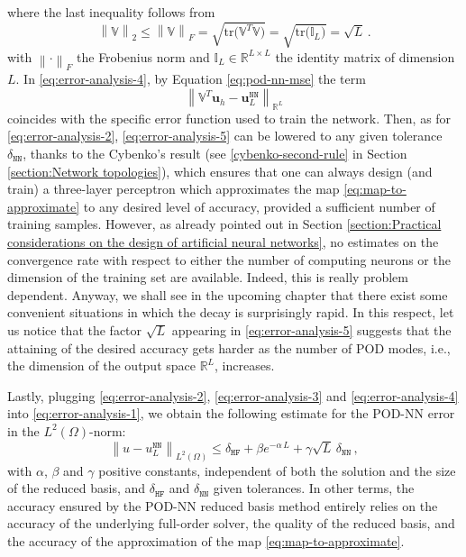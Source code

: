 \documentclass[12pt, a4paper, twoside, openright]{report}
\numberwithin{equation}{chapter}
\theoremstyle{theorem}
\theoremstyle{definition}
\theoremstyle{remark}
\theoremstyle{proposition}
\numberwithin{figure}{chapter}
\newcommand{\norm}[1]{\left\lVert#1\right\rVert}
\begin{document}
		where the last inequality follows from
		\begin{equation*}
			\norm{\mathbb{V}}_2 \leq \norm{\mathbb{V}}_F = \sqrt{\text{tr} \big( \mathbb{V}^T \mathbb{V} \big)} = \sqrt{\text{tr} \big( \mathbb{I}_L \big)} = \sqrt{L} \, .
		\end{equation*}
		with $\norm{\cdot}_F$ the Frobenius norm and $\mathbb{I}_L \in \mathbb{R}^{L \times L}$ the identity matrix of dimension $L$. In \eqref{eq:error-analysis-4}, by Equation \eqref{eq:pod-nn-mse} the term
		\begin{equation}
			\label{eq:error-analysis-5}
			\norm{\mathbb{V}^T \mathbf{u}_h - \mathbf{u}_L^{\texttt{NN}}}_{\mathbb{R}^L}
		\end{equation}
		coincides with the specific error function used to train the network. Then, as for \eqref{eq:error-analysis-2}, \eqref{eq:error-analysis-5} can be lowered to any given tolerance $\delta_{\texttt{NN}}$, thanks to the Cybenko's result (see \ref{cybenko-second-rule} in Section \ref{section:Network topologies}), which ensures that one can always design (and train) a three-layer perceptron which approximates the map \eqref{eq:map-to-approximate} to any desired level of accuracy, provided a sufficient number of training samples. However, as already pointed out in Section \ref{section:Practical considerations on the design of artificial neural networks}, no estimates on the convergence rate with respect to either the number of computing neurons or the dimension of the training set are available. Indeed, this is really problem dependent. Anyway, we shall see in the upcoming chapter that there exist some convenient situations in which the decay is surprisingly rapid. In this respect, let us notice that the factor $\sqrt{L}$ appearing in \eqref{eq:error-analysis-5} suggests that the attaining of the desired accuracy gets harder as the number of POD modes, i.e., the dimension of the output space $\mathbb{R}^L$, increases.
		
		Lastly, plugging \eqref{eq:error-analysis-2}, \eqref{eq:error-analysis-3} and \eqref{eq:error-analysis-4} into \eqref{eq:error-analysis-1}, we obtain the following estimate for the POD-NN error in the $L^2(\Omega)$-norm:
		\begin{equation}
			\label{eq:error-analysis-final}
			\norm{u - u_L^{\texttt{NN}}}_{L^2(\Omega)} \leq \delta_{\texttt{HF}} + \beta e^{-\alpha \, L} + \gamma \sqrt{L} \, \delta_{\texttt{NN}} \, ,
		\end{equation}
		with $\alpha$, $\beta$ and $\gamma$ positive constants, independent of both the solution and the size of the reduced basis, and $\delta_{\texttt{HF}}$ and $\delta_{\texttt{NN}}$ given tolerances. In other terms, the accuracy ensured by the POD-NN reduced basis method entirely relies on the accuracy of the underlying full-order solver, the quality of the reduced basis, and the accuracy of the approximation of the map \eqref{eq:map-to-approximate}.
				
\end{document}
